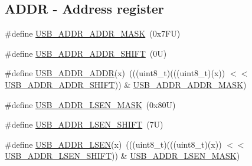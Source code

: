 \subsection*{A\+D\+DR -\/ Address register}
\begin{DoxyCompactItemize}
\item 
\#define \mbox{\hyperlink{group___u_s_b___register___masks_ga7ccfd8bde2bb3831d13280315df4501c}{U\+S\+B\+\_\+\+A\+D\+D\+R\+\_\+\+A\+D\+D\+R\+\_\+\+M\+A\+SK}}~(0x7\+F\+U)
\item 
\#define \mbox{\hyperlink{group___u_s_b___register___masks_ga57c7c394504da946dae75d5b20a2f297}{U\+S\+B\+\_\+\+A\+D\+D\+R\+\_\+\+A\+D\+D\+R\+\_\+\+S\+H\+I\+FT}}~(0\+U)
\item 
\#define \mbox{\hyperlink{group___u_s_b___register___masks_gad42e50014eedee91315521b19199ef39}{U\+S\+B\+\_\+\+A\+D\+D\+R\+\_\+\+A\+D\+DR}}(x)~(((uint8\+\_\+t)(((uint8\+\_\+t)(x)) $<$$<$ \mbox{\hyperlink{group___u_s_b___register___masks_ga57c7c394504da946dae75d5b20a2f297}{U\+S\+B\+\_\+\+A\+D\+D\+R\+\_\+\+A\+D\+D\+R\+\_\+\+S\+H\+I\+FT}})) \& \mbox{\hyperlink{group___u_s_b___register___masks_ga7ccfd8bde2bb3831d13280315df4501c}{U\+S\+B\+\_\+\+A\+D\+D\+R\+\_\+\+A\+D\+D\+R\+\_\+\+M\+A\+SK}})
\item 
\#define \mbox{\hyperlink{group___u_s_b___register___masks_ga695e1ebe159d45ecd94fe40627ac121e}{U\+S\+B\+\_\+\+A\+D\+D\+R\+\_\+\+L\+S\+E\+N\+\_\+\+M\+A\+SK}}~(0x80\+U)
\item 
\#define \mbox{\hyperlink{group___u_s_b___register___masks_ga7c81adb1ac1c658006ea0ebfd4644634}{U\+S\+B\+\_\+\+A\+D\+D\+R\+\_\+\+L\+S\+E\+N\+\_\+\+S\+H\+I\+FT}}~(7\+U)
\item 
\#define \mbox{\hyperlink{group___u_s_b___register___masks_ga4e865cea820a5fafc3275610ccc2c0c4}{U\+S\+B\+\_\+\+A\+D\+D\+R\+\_\+\+L\+S\+EN}}(x)~(((uint8\+\_\+t)(((uint8\+\_\+t)(x)) $<$$<$ \mbox{\hyperlink{group___u_s_b___register___masks_ga7c81adb1ac1c658006ea0ebfd4644634}{U\+S\+B\+\_\+\+A\+D\+D\+R\+\_\+\+L\+S\+E\+N\+\_\+\+S\+H\+I\+FT}})) \& \mbox{\hyperlink{group___u_s_b___register___masks_ga695e1ebe159d45ecd94fe40627ac121e}{U\+S\+B\+\_\+\+A\+D\+D\+R\+\_\+\+L\+S\+E\+N\+\_\+\+M\+A\+SK}})
\end{DoxyCompactItemize}
